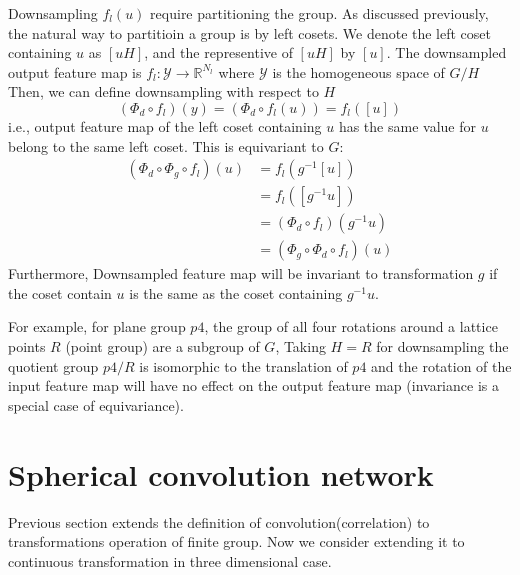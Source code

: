 \documentclass{IEEEtran}
\begin{document}
Downsampling $f_{l}(u)$ require partitioning the group. As discussed previously, the natural way to partitioin a group
is by left cosets. We denote the left coset containing $u$ as $[uH]$, and the representive of $[uH]$ by $[u]$. The downsampled output feature map is 
$f_l\colon \mathcal{Y} \to \mathbb{R}^{N_l}$ where $\mathcal{Y}$ is the homogeneous space of $G/H$
Then, we can define downsampling with respect to $H$
\begin{equation}
    (\Phi_d \circ f_l)(y) = (\Phi_d \circ f_l(u)) = f_l([u])
\end{equation}
i.e., output feature map of the left coset containing $u$ has the same value for $u$ belong to the same left coset. 
This is equivariant to $G$:
\begin{align*}
    (\Phi_d \circ \Phi_g \circ f_l)(u) &= f_l(g^{-1}[u]) \\
    &= f_l([g^{-1}u]) \\
    &= (\Phi_d \circ f_l)(g^{-1}u) \\
    &= (\Phi_g \circ \Phi_d \circ f_l)(u)
\end{align*}
Furthermore, Downsampled feature map will be invariant to transformation $g$ 
if the coset contain $u$ is the same as the coset containing $g^{-1}u$.



For example, for plane group $p4$, the group of all four rotations around a lattice points $R$ (point group) are a subgroup of $G$,
Taking $H = R$ for downsampling
the quotient group $p4/R$ is isomorphic to the translation of $p4$ and 
the rotation of the input feature map will have no effect on the output feature map (invariance is a special case of equivariance). 

\section{Spherical convolution network}
Previous section extends the definition of convolution(correlation) to transformations operation of finite group. 
Now we consider extending it to continuous transformation\cite{cohen_spherical_2018} in three dimensional case. 
\end{document}
